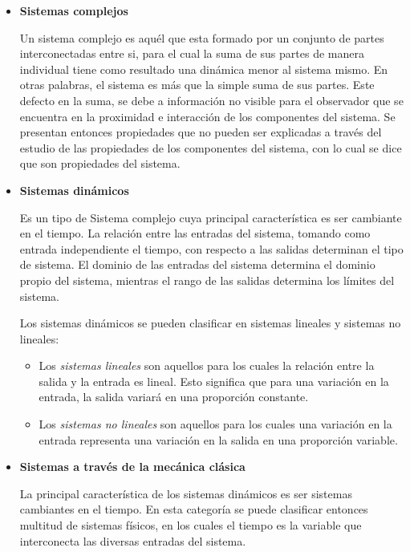 \documentclass[letterpaper, 11pt, oneside]{article}
\theoremstyle{definition}
\theoremstyle{remark}
\begin{document}
\newpage
\begin{itemize}
\item {\bf Sistemas complejos \par}
Un sistema complejo es aquél que esta formado por un conjunto de partes interconectadas entre si, para el cual la suma de sus partes de manera individual tiene como resultado una dinámica menor al sistema mismo. En otras palabras, el sistema es más que la simple suma de sus partes. Este defecto en la suma, se debe a información no visible para el observador que se encuentra en la proximidad e interacción de los componentes del sistema. Se presentan entonces propiedades que no pueden ser explicadas a través del estudio de las propiedades de los componentes del sistema, con lo cual se dice que son propiedades del sistema.

\item {\bf Sistemas dinámicos \par}
Es un tipo de Sistema complejo cuya principal característica es ser cambiante en el tiempo. La relación entre las entradas del sistema, tomando como entrada independiente el tiempo, con respecto a las salidas determinan el tipo de sistema. El dominio de las entradas del sistema determina el dominio propio del sistema, mientras el rango de las salidas determina los límites del sistema.

Los sistemas dinámicos se pueden clasificar en sistemas lineales y sistemas no lineales:
\begin{itemize}
 \item Los \textit{sistemas lineales} son aquellos para los cuales la relación entre la salida y la entrada es lineal. Esto significa que para una variación en la entrada, la salida variará en una proporción constante.
  \item Los \textit{sistemas no lineales} son aquellos para los cuales una variación en la entrada representa una variación en la salida en una proporción variable.
\end{itemize}

\item {\bf Sistemas a través de la mecánica clásica \par}
La principal característica de los sistemas dinámicos es ser sistemas cambiantes en el tiempo. En esta categoría se puede clasificar entonces multitud de sistemas físicos, en los cuales el tiempo es la variable que interconecta las diversas entradas del sistema.


\end{itemize}
\end{document}
